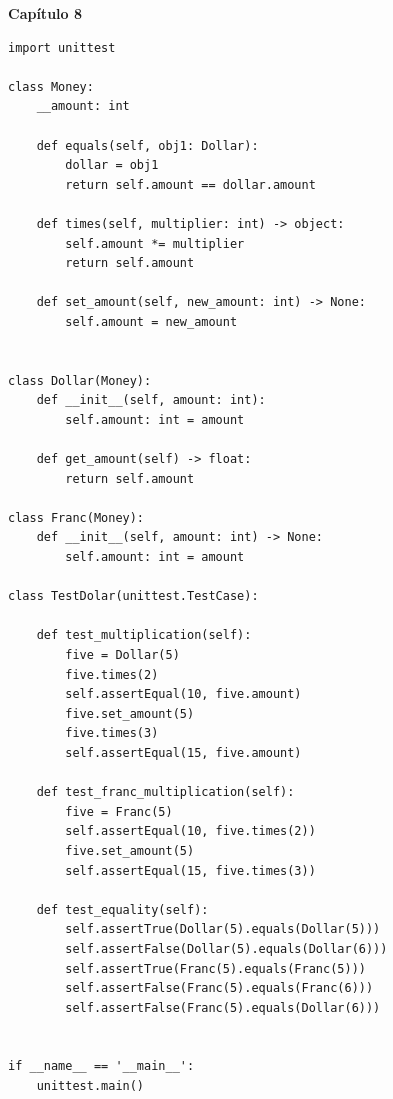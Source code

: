 \documentclass[a4paper,12pt]{article}
\newcommand{\capitulo}[1]{
    \vspace{1em}
    \noindent
    \colorbox{black!15}{
        \parbox{\dimexpr\linewidth-2\fboxsep}{
            \centering \Large \textbf{#1}
        }
    }
    \vspace{1em}
}
\begin{document}
\capitulo{Capítulo 8}
\begin{lstlisting}[style=pythonstyle]
import unittest

class Money:
    __amount: int

    def equals(self, obj1: Dollar):
        dollar = obj1
        return self.amount == dollar.amount

    def times(self, multiplier: int) -> object:
        self.amount *= multiplier
        return self.amount

    def set_amount(self, new_amount: int) -> None:
        self.amount = new_amount


class Dollar(Money):
    def __init__(self, amount: int):
        self.amount: int = amount

    def get_amount(self) -> float:
        return self.amount

class Franc(Money):
    def __init__(self, amount: int) -> None:
        self.amount: int = amount

class TestDolar(unittest.TestCase):

    def test_multiplication(self):
        five = Dollar(5)
        five.times(2) 
        self.assertEqual(10, five.amount)
        five.set_amount(5)
        five.times(3) 
        self.assertEqual(15, five.amount)

    def test_franc_multiplication(self):
        five = Franc(5)
        self.assertEqual(10, five.times(2))
        five.set_amount(5)
        self.assertEqual(15, five.times(3))

    def test_equality(self):
        self.assertTrue(Dollar(5).equals(Dollar(5)))
        self.assertFalse(Dollar(5).equals(Dollar(6)))
        self.assertTrue(Franc(5).equals(Franc(5)))
        self.assertFalse(Franc(5).equals(Franc(6)))
        self.assertFalse(Franc(5).equals(Dollar(6)))


if __name__ == '__main__':
    unittest.main()
\end{lstlisting}
\end{document}
